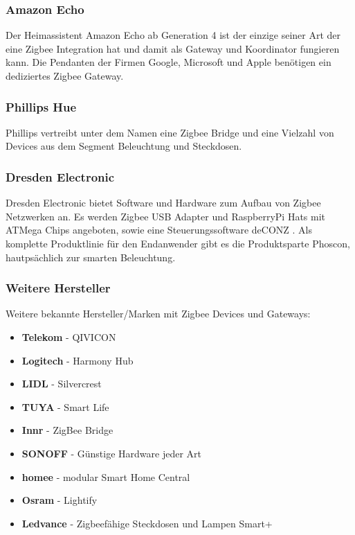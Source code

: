 \subsubsection{Amazon Echo}
    Der Heimassistent Amazon Echo ab Generation 4 ist der einzige seiner Art der eine Zigbee Integration hat und damit als Gateway und Koordinator fungieren
    kann. Die Pendanten der Firmen Google, Microsoft und Apple benötigen ein dediziertes Zigbee Gateway.

\subsubsection{Phillips Hue}
    Phillips vertreibt unter dem Namen eine Zigbee Bridge und eine Vielzahl von Devices aus dem Segment Beleuchtung und Steckdosen. 

\subsubsection{Dresden Electronic}
    Dresden Electronic bietet Software und Hardware zum Aufbau von Zigbee Netzwerken an. Es werden Zigbee USB Adapter und RaspberryPi Hats mit ATMega Chips angeboten,
    sowie eine Steuerungssoftware \grqq deCONZ \grqq{}. Als komplette Produktlinie für den Endanwender gibt es die Produktsparte
    \grqq Phoscon\grqq{}, hautpsächlich zur smarten Beleuchtung.

\subsubsection*{Weitere Hersteller}
Weitere bekannte Hersteller/Marken mit Zigbee Devices und Gateways:
\begin{itemize}
    \item \textbf{Telekom} - QIVICON
    \item \textbf{Logitech} - Harmony Hub
    \item \textbf{LIDL} - Silvercrest
    \item \textbf{TUYA} - Smart Life
    \item \textbf{Innr} - ZigBee Bridge
    \item \textbf{SONOFF} - Günstige Hardware jeder Art
    \item \textbf{homee} -  modular Smart Home Central
    \item \textbf{Osram} - Lightify
    \item \textbf{Ledvance} - Zigbeefähige Steckdosen und Lampen \grqq Smart+ \grqq{}
\end{itemize}

